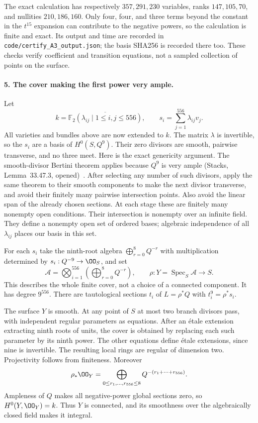 The exact calculation has respectively $357,291,230$ variables,
ranks $147,105,70$, and nullities $210,186,160$. Only four, four,
and three terms beyond the constant in the $t^{15}$ expansion can
contribute to the negative powers, so the calculation is finite and
exact. Its output and time are recorded in
\texttt{code/certify\_A3\_output.json}; the basis SHA256 is recorded
there too. These checks verify coefficient and transition equations,
not a sampled collection of points on the surface.

\paragraph{5. The cover making the first power very ample.}
Let
\[
 k=\overline{\mathbb F_2(\lambda_{ij}\mid1\leq i,j\leq556)},
 \qquad s_i=\sum_{j=1}^{556}\lambda_{ij}v_j.
\]
All varieties and bundles above are now extended to $k$. The matrix
$\lambda$ is invertible, so the $s_i$ are a basis of $H^0(S,Q^9)$.
Their zero divisors are smooth, pairwise transverse, and no three
meet. Here is the exact genericity argument. The smooth-divisor
Bertini theorem applies because $Q^9$ is very ample (Stacks,
Lemma~33.47.3, opened)~\cite{StacksBertini}. After selecting any number of such divisors,
apply the same theorem to their smooth components to make the next
divisor transverse, and avoid their finitely many pairwise
intersection points. Also avoid the linear span of the already
chosen sections. At each stage these are finitely many nonempty
open conditions. Their intersection is nonempty over an infinite
field. They define a nonempty open set of ordered bases; algebraic
independence of all $\lambda_{ij}$ places our basis in this set.

For each $s_i$ take the ninth-root algebra
$\bigoplus_{r=0}^{8}Q^{-r}$ with multiplication determined by
$s_i:Q^{-9}\to\OO_S$, and set
\begin{equation}\label{a:root-algebra}
 \mathcal A=\bigotimes_{i=1}^{556}
       \left(\bigoplus_{r=0}^{8}Q^{-r}\right),\qquad
 \rho:Y=\operatorname{Spec}_S\mathcal A\longrightarrow S.
\end{equation}
This describes the whole finite cover, not a choice of a connected
component. It has degree $9^{556}$. There are tautological sections
$t_i$ of $L=\rho^*Q$ with $t_i^9=\rho^*s_i$.

The surface $Y$ is smooth. At any point of $S$ at most two branch
divisors pass, with independent regular parameters as equations.
After an étale extension extracting ninth roots of units, the cover
is obtained by replacing each such parameter by its ninth power.
The other equations define étale extensions, since nine is
invertible. The resulting local rings are regular of dimension two.
Projectivity follows from finiteness. Moreover
\begin{equation}\label{a:root-directsum}
 \rho_*\OO_Y=
 \bigoplus_{0\leq r_1,\ldots,r_{556}\leq8}
                   Q^{-(r_1+\cdots+r_{556})}.
\end{equation}
Ampleness of $Q$ makes all negative-power global sections zero, so
$H^0(Y,\OO_Y)=k$. Thus $Y$ is connected, and its smoothness over the
algebraically closed field makes it integral.


